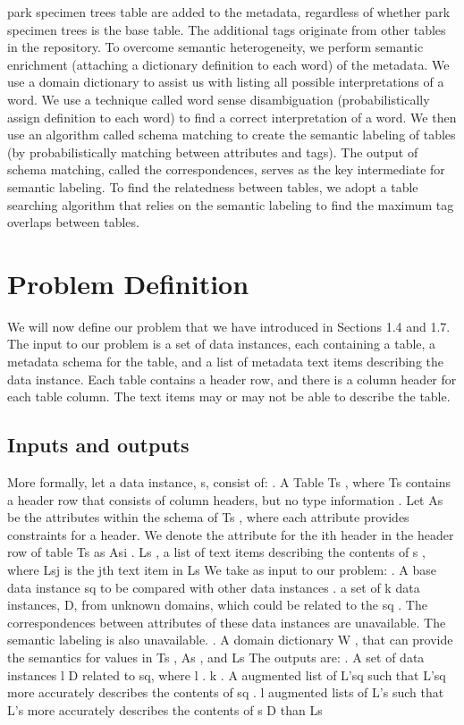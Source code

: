 park specimen trees table are added to the metadata, regardless of whether park specimen trees is the base table. The additional tags originate from other tables in the repository.
To overcome semantic heterogeneity, we perform semantic enrichment (attaching a dictionary definition to each word) of the metadata. We use a domain dictionary to assist us with listing all possible interpretations of a word. We use a technique called word sense disambiguation (probabilistically assign definition to each word) to find a correct interpretation of a word. We then use an algorithm called schema matching to create the semantic labeling of tables (by probabilistically matching between attributes and tags). The output of schema matching, called the correspondences, serves as the key intermediate for semantic labeling. To find the relatedness between tables, we adopt a table searching algorithm that relies on the semantic labeling to find the maximum tag overlaps between tables.

\section{Problem Definition}
\label{sec:ProblemDefinition}

We will now define our problem that we have introduced in Sections 1.4 and 1.7. The input to our problem is a set of data instances, each containing a table, a metadata schema for the table, and a list of metadata text items describing the data instance. Each table contains a header row, and there is a column header for each table column. The text items may or may not be able to describe the table.

\subsection{Inputs and outputs}
More formally, let a data instance, s, consist of:
. A Table Ts , where Ts contains a header row that consists of column headers, but no type information
. Let As be the attributes within the schema of Ts , where each attribute provides constraints for a header. We denote the attribute for the ith header in the header row of table Ts as Asi
. Ls , a list of text items describing the contents of s , where Lsj is the jth text item in Ls
We take as input to our problem:
. A base data instance sq to be compared with other data instances
. a set of k data instances, D, from unknown domains, which could be related to the sq . The correspondences between attributes of these data instances are unavailable. The semantic labeling is also unavailable.
. A domain dictionary W , that can provide the semantics for values in Ts , As , and Ls
The outputs are:
. A set of data instances l  D related to sq, where l . k
. A augmented list of L'sq such that L'sq more accurately describes the contents of sq
. l augmented lists of L's such that L's more accurately describes the contents of s  D than Ls

